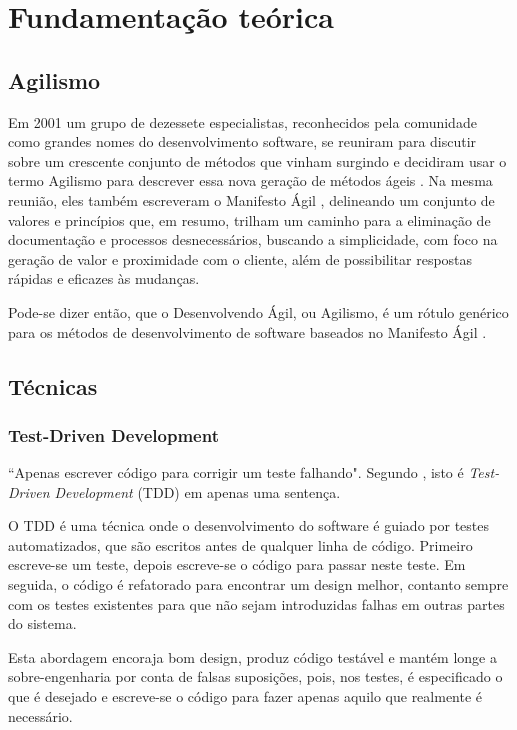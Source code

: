 \chapter{Fundamentação teórica}

\section{Agilismo}

Em 2001 um grupo de dezessete especialistas, reconhecidos pela comunidade como
grandes nomes do desenvolvimento software, se reuniram para discutir sobre um
crescente conjunto de métodos que vinham surgindo e decidiram usar o termo
Agilismo para descrever essa nova geração de métodos ágeis \cite{AgileStory}. Na
mesma reunião, eles também escreveram o Manifesto Ágil \cite{AgileManifesto},
delineando um conjunto de valores e princípios que, em resumo, trilham um
caminho para a eliminação de documentação e processos desnecessários, buscando a
simplicidade, com foco na geração de valor e proximidade com o cliente, além de
possibilitar respostas rápidas e eficazes às mudanças.

Pode-se dizer então, que o Desenvolvendo Ágil, ou Agilismo, é um rótulo genérico
para os métodos de desenvolvimento de software baseados no Manifesto Ágil
\cite{BDDRodrigo}.


\section{Técnicas}

\subsection{Test-Driven Development}
``Apenas escrever código para corrigir um teste falhando". Segundo
, isto é \textit{Test-Driven Development} (TDD)
\cite{TDDbyExample} em apenas uma sentença.

O TDD é uma técnica onde o desenvolvimento do software é guiado por testes
automatizados, que são escritos antes de qualquer linha de código. Primeiro
escreve-se um teste, depois escreve-se o código para passar neste teste. Em
seguida, o código é refatorado para encontrar um design melhor, contanto sempre
com os testes existentes para que não sejam introduzidas falhas em outras partes
do sistema.

Esta abordagem encoraja bom design, produz código testável e mantém longe a
sobre-engenharia por conta de falsas suposições, pois, nos testes, é
especificado o que é desejado e escreve-se o código para fazer apenas aquilo que
realmente é necessário. \cite{TestDrivenKoskela, TDDbyExample, EmpiricalTDD}

